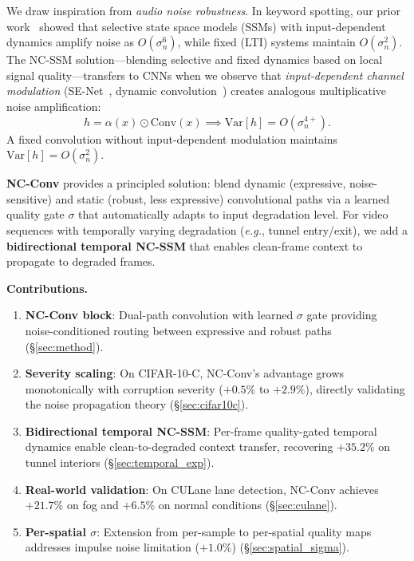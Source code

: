 \documentclass[runningheads]{llncs}
\newcommand{\eg}{\emph{e.g.}}
\begin{document}
We draw inspiration from \emph{audio noise robustness}.
In keyword spotting, our prior work~\cite{choi2026ncssm} showed that selective state space models (SSMs) with input-dependent dynamics amplify noise as $O(\sigma_n^6)$, while fixed (LTI) systems maintain $O(\sigma_n^2)$.
The NC-SSM solution---blending selective and fixed dynamics based on local signal quality---transfers to CNNs when we observe that \emph{input-dependent channel modulation} (SE-Net~\cite{hu2018squeeze}, dynamic convolution~\cite{chen2020dynamic}) creates analogous multiplicative noise amplification:
\begin{equation}
h = \alpha(x) \odot \text{Conv}(x) \implies \text{Var}[h] = O(\sigma_n^{4+}).
\end{equation}
A fixed convolution without input-dependent modulation maintains $\text{Var}[h] = O(\sigma_n^2)$.

\textbf{NC-Conv} provides a principled solution: blend dynamic (expressive, noise-sensitive) and static (robust, less expressive) convolutional paths via a learned quality gate $\sigma$ that automatically adapts to input degradation level.
For video sequences with temporally varying degradation (\eg, tunnel entry/exit), we add a \textbf{bidirectional temporal NC-SSM} that enables clean-frame context to propagate to degraded frames.

\noindent\textbf{Contributions.}
\begin{enumerate}
\setlength\itemsep{0pt}
\item \textbf{NC-Conv block}: Dual-path convolution with learned $\sigma$ gate providing noise-conditioned routing between expressive and robust paths (\S\ref{sec:method}).
\item \textbf{Severity scaling}: On CIFAR-10-C, NC-Conv's advantage grows monotonically with corruption severity ($+0.5\%$ to $+2.9\%$), directly validating the noise propagation theory (\S\ref{sec:cifar10c}).
\item \textbf{Bidirectional temporal NC-SSM}: Per-frame quality-gated temporal dynamics enable clean-to-degraded context transfer, recovering $+35.2\%$ on tunnel interiors (\S\ref{sec:temporal_exp}).
\item \textbf{Real-world validation}: On CULane lane detection, NC-Conv achieves $+21.7\%$ on fog and $+6.5\%$ on normal conditions (\S\ref{sec:culane}).
\item \textbf{Per-spatial $\sigma$}: Extension from per-sample to per-spatial quality maps addresses impulse noise limitation ($+1.0\%$) (\S\ref{sec:spatial_sigma}).
\end{enumerate}
\end{document}
